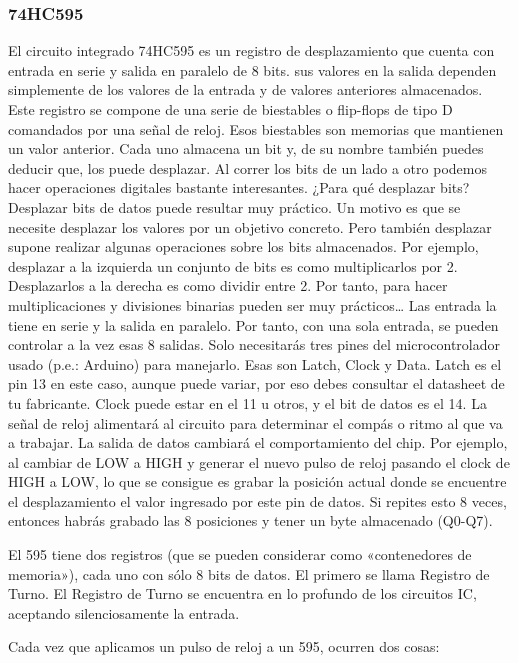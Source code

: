 \documentclass{article}
\begin{document}
\subsubsection*{74HC595}
El circuito integrado 74HC595 es un registro de desplazamiento que cuenta con entrada en serie y salida en paralelo de 8 bits.
 sus valores en la salida dependen simplemente de los valores de la entrada y de valores anteriores almacenados.
  Este registro se compone de una serie de biestables o flip-flops de tipo D comandados por una señal de reloj. Esos biestables son memorias que mantienen un valor anterior. Cada uno almacena un bit y, de su nombre también puedes deducir que, los puede desplazar. Al correr los bits de un lado a otro podemos hacer operaciones digitales bastante interesantes.
 ¿Para qué desplazar bits? Desplazar bits de datos puede resultar muy práctico. Un motivo es que se necesite desplazar los valores por un objetivo concreto. Pero también desplazar supone realizar algunas operaciones sobre los bits almacenados. Por ejemplo, desplazar a la izquierda un conjunto de bits es como multiplicarlos por 2. Desplazarlos a la derecha es como dividir entre 2. Por tanto, para hacer multiplicaciones y divisiones binarias pueden ser muy prácticos…
 Las entrada la tiene en serie y la salida en paralelo. Por tanto, con una sola entrada, se pueden controlar a la vez esas 8 salidas. Solo necesitarás tres pines del microcontrolador usado (p.e.: Arduino) para manejarlo. Esas son Latch, Clock y Data. Latch es el pin 13 en este caso, aunque puede variar, por eso debes consultar el datasheet de tu fabricante. Clock puede estar en el 11 u otros, y el bit de datos es el 14.
 La señal de reloj alimentará al circuito para determinar el compás o ritmo al que va a trabajar. La salida de datos cambiará el comportamiento del chip. Por ejemplo, al cambiar de LOW a HIGH y generar el nuevo pulso de reloj pasando el clock de HIGH a LOW, lo que se consigue es grabar la posición actual donde se encuentre el desplazamiento el valor ingresado por este pin de datos. Si repites esto 8 veces, entonces habrás grabado las 8 posiciones y tener un byte almacenado (Q0-Q7).
 
 El 595 tiene dos registros (que se pueden considerar como «contenedores de memoria»), cada uno con sólo 8 bits de datos. El primero se llama Registro de Turno. El Registro de Turno se encuentra en lo profundo de los circuitos IC, aceptando silenciosamente la entrada.

Cada vez que aplicamos un pulso de reloj a un 595, ocurren dos cosas:
\end{document}
